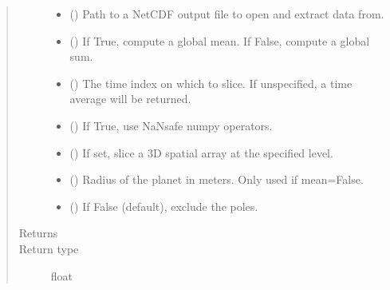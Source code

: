 \documentclass[letterpaper,10pt,english]{sphinxmanual}
\begin{document}
\begin{fulllineitems}
\begin{quote}
\begin{description}
\begin{itemize}
\item {} 
 (\sphinxstyleliteralemphasis{\sphinxupquote{, }}) \textendash{} Path to a NetCDF output file to open and extract data from.

\item {} 
 (\sphinxstyleliteralemphasis{\sphinxupquote{, }}) \textendash{} If True, compute a global mean. If False, compute a global sum.

\item {} 
 (\sphinxstyleliteralemphasis{\sphinxupquote{, }}) \textendash{} The time index on which to slice. If unspecified, a time average will be returned.

\item {} 
 (\sphinxstyleliteralemphasis{\sphinxupquote{, }}) \textendash{} If True, use NaN\sphinxhyphen{}safe numpy operators.

\item {} 
 (\sphinxstyleliteralemphasis{\sphinxupquote{, }}) \textendash{} If set, slice a 3D spatial array at the specified level.

\item {} 
 (\sphinxstyleliteralemphasis{\sphinxupquote{, }}) \textendash{} Radius of the planet in meters. Only used if mean=False.

\item {} 
 (\sphinxstyleliteralemphasis{\sphinxupquote{, }}) \textendash{} If False (default), exclude the poles.

\end{itemize}

\item[{Returns}] \leavevmode


\item[{Return type}] \leavevmode
float

\end{description}\end{quote}

\end{fulllineitems}
\end{document}
